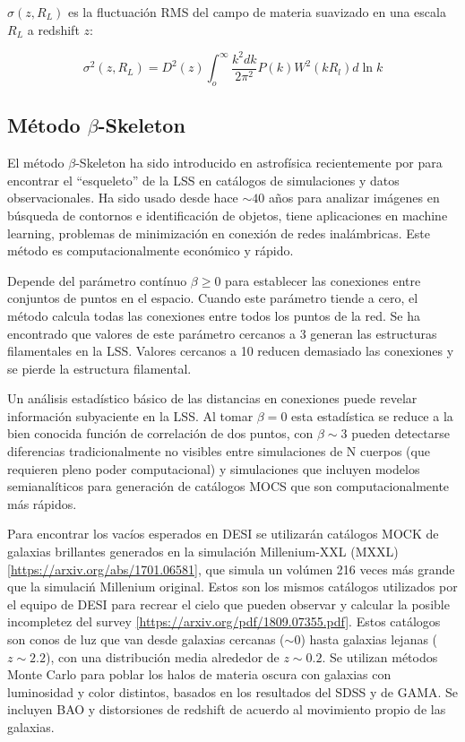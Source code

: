 \documentclass[preprint]{aastex62}
\begin{document}
  $\sigma(z,R_L)$ es la fluctuación RMS del campo de materia suavizado en una escala $R_L$ a
  redshift $z$:
  
  \begin{equation}
    \sigma^2(z,R_L) = D^2(z) \int_o^{\infty} \frac{k^2dk}{2\pi^2}P(k) W^2(kR_l)d \ln k
  \end{equation}



  \subsection{Método $\beta$-Skeleton}


  El método $\beta$-Skeleton ha sido introducido en astrofísica recientemente por \citet{Fang2018} para
  encontrar el ``esqueleto'' de la  LSS en catálogos de simulaciones y datos observacionales.
  Ha sido usado desde hace $\sim 40$ años para analizar imágenes en búsqueda de contornos e identificación
  de objetos, tiene aplicaciones en machine learning, problemas de minimización en conexión de redes
  inalámbricas. Este método es computacionalmente económico y rápido.
  
  Depende del parámetro contínuo $\beta \geq 0$ para establecer las conexiones entre conjuntos de
  puntos en el espacio. Cuando este parámetro tiende a cero, el método calcula todas las conexiones
  entre todos los puntos de la red. Se ha encontrado que valores de este parámetro cercanos a 3
  generan las estructuras filamentales en la LSS. Valores cercanos a 10 reducen demasiado las
  conexiones y se pierde la estructura filamental. 

  Un análisis estadístico básico de las distancias en conexiones puede revelar información subyaciente
  en la LSS. Al tomar $\beta = 0$ esta estadística se reduce a la bien conocida función de correlación
  de dos puntos, con $\beta \sim 3$ pueden detectarse diferencias tradicionalmente no visibles entre
  simulaciones de N cuerpos (que requieren pleno poder computacional) y simulaciones que incluyen
  modelos semianalíticos para generación de catálogos MOCS que son computacionalmente más rápidos.


  Para encontrar los vacíos esperados en DESI se utilizarán catálogos MOCK de galaxias brillantes
  generados en la simulación Millenium-XXL (MXXL) \ref{https://arxiv.org/abs/1701.06581}, que simula un
  volúmen 216 veces más grande que la simulaciń Millenium original. Estos
  son los mismos catálogos utilizados por el equipo de DESI para recrear el cielo que pueden
  observar y calcular la posible incompletez del survey \ref{https://arxiv.org/pdf/1809.07355.pdf}.
  Estos catálogos son conos de luz que van
  desde galaxias cercanas ($\sim0$) hasta galaxias lejanas ($z\sim2.2$), con una distribución
  media alrededor de $z\sim 0.2$. Se utilizan métodos Monte Carlo para poblar los halos de materia
  oscura con galaxias con luminosidad y color distintos, basados en los resultados del SDSS y de
  GAMA. Se incluyen BAO y distorsiones de redshift de acuerdo al movimiento propio de las galaxias.
\end{document}
